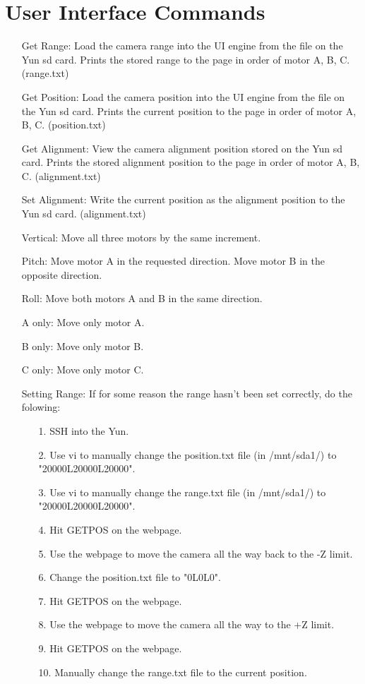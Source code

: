 \documentclass[11pt]{article}
\begin{document}
\section{User Interface Commands}
\begin{enumerate}
	\item[Get Range:] Load the camera range into the UI engine from the file on the Yun sd card.  Prints the stored range to the page in order of motor A, B, C. (range.txt)
	\item[Get Position:] Load the camera position into the UI engine from the file on the Yun sd card. Prints the current position to the page in order of motor A, B, C. (position.txt)
	\item[Get Alignment:] View the camera alignment position stored on the Yun sd card. Prints the stored alignment position to the page in order of motor A, B, C. (alignment.txt)
	\item[Set Alignment:] Write the current position as the alignment position to the Yun sd card. (alignment.txt)
	\item[Vertical:] Move all three motors by the same increment.
	\item[Pitch:] Move motor A in the requested direction. Move motor B in the opposite direction.
	\item[Roll:] Move both motors A and B in the same direction.
	\item[A only:] Move only motor A.
	\item[B only:] Move only motor B.
	\item[C only:] Move only motor C.
	
	\item[Setting Range:] If for some reason the range hasn't been set correctly, do the folowing:
	\begin{enumerate} 
		\item[1.]SSH into the Yun.
		\item[2.]Use vi to manually change the position.txt file (in /mnt/sda1/) to "20000L20000L20000".
		\item[3.]Use vi to manually change the range.txt file (in /mnt/sda1/) to "20000L20000L20000".
		\item[4.]Hit GETPOS on the webpage.
		\item[5.]Use the webpage to move the camera all the way back to the -Z limit.
		\item[6.]Change the position.txt file to "0L0L0".
		\item[7.]Hit GETPOS on the webpage.
		\item[8.]Use the webpage to move the camera all the way to the +Z limit.
		\item[9.]Hit GETPOS on the webpage.
		\item[10.]Manually change the range.txt file to the current position.
	\end{enumerate}
\end{enumerate}
\end{document}
